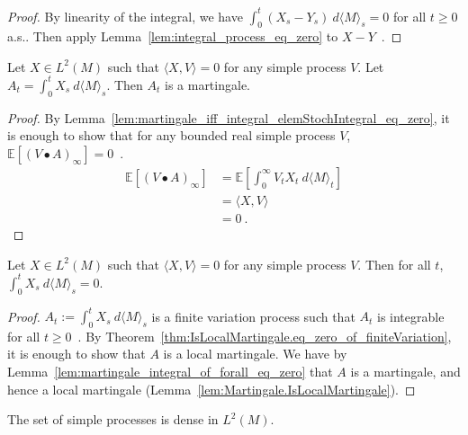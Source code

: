 \begin{proof}
By linearity of the integral, we have $\int_0^t (X_s - Y_s) \: d\langle M \rangle_s = 0$ for all $t \ge 0$ a.s..
Then apply Lemma~\ref{lem:integral_process_eq_zero} to $X - Y$~.
\end{proof}


\begin{lemma}\label{lem:martingale_integral_of_forall_eq_zero}
Let $X \in L^2(M)$ such that $\langle X, V\rangle = 0$ for any simple process $V$. Let $A_t = \int_0^t X_s \: d\langle M \rangle_s$. Then $A_t$ is a martingale.
\end{lemma}

\begin{proof}
By Lemma~\ref{lem:martingale_iff_integral_elemStochIntegral_eq_zero}, it is enough to show that for any bounded real simple process $V$, $\mathbb{E}[(V \bullet A)_\infty] = 0$~.
\begin{align*}
  \mathbb{E}\left[(V \bullet A)_\infty\right]
  &= \mathbb{E}\left[ \int_0^{\infty} V_t X_t \: d\langle M \rangle_t \right]
  \\
  &= \langle X, V \rangle
  \\
  &= 0
  \: .
\end{align*}
\end{proof}


\begin{lemma}\label{lem:integral_eq_zero_of_forall_eq_zero}
Let $X \in L^2(M)$ such that $\langle X, V\rangle = 0$ for any simple process $V$. Then for all $t$, $\int_0^t X_s \: d\langle M \rangle_s = 0$.
\end{lemma}

\begin{proof}
$A_t := \int_0^t X_s \: d\langle M \rangle_s$ is a finite variation process such that $A_t$ is integrable for all $t \ge 0$~.
By Theorem~\ref{thm:IsLocalMartingale.eq_zero_of_finiteVariation}, it is enough to show that $A$ is a local martingale. We have by Lemma~\ref{lem:martingale_integral_of_forall_eq_zero} that $A$ is a martingale, and hence a local martingale (Lemma~\ref{lem:Martingale.IsLocalMartingale}).
\end{proof}


\begin{lemma}\label{lem:dense_simpleProcess}
The set of simple processes is dense in $L^2(M)$.
\end{lemma}


